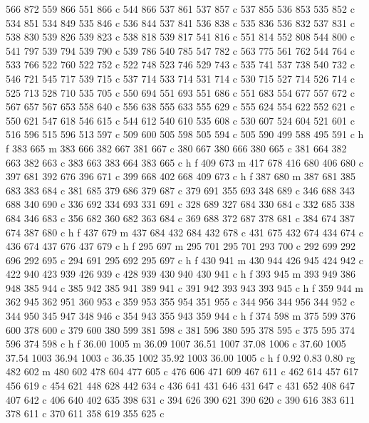 {{   566 872 559 866 551 866 c
   544 866 537 861 537 857 c
   537 855 536 853 535 852 c
   534 851 534 849 535 846 c
   536 844 537 841 536 838 c
   535 836 536 832 537 831 c
   538 830 539 826 539 823 c
   538 818 539 817 541 816 c
   551 814 552 808 544 800 c
   541 797 539 794 539 790 c
   539 786 540 785 547 782 c
   563 775 561 762 544 764 c
   533 766 522 760 522 752 c
   522 748 523 746 529 743 c
   535 741 537 738 540 732 c
   546 721 545 717 539 715 c
   537 714 533 714 531 714 c
   530 715 527 714 526 714 c
   525 713 528 710 535 705 c
   550 694 551 693 551 686 c
   551 683 554 677 557 672 c
   567 657 567 653 558 640 c
   556 638 555 633 555 629 c
   555 624 554 622 552 621 c
   550 621 547 618 546 615 c
   544 612 540 610 535 608 c
   530 607 524 604 521 601 c
   516 596 515 596 513 597 c
   509 600 505 598 505 594 c
   505 590 499 588 495 591 c
   h f
   383 665 m
   383 666 382 667 381 667 c
   380 667 380 666 380 665 c
   381 664 382 663 382 663 c
   383 663 383 664 383 665 c
   h f
   409 673 m
   417 678 416 680 406 680 c
   397 681 392 676 396 671 c
   399 668 402 668 409 673 c
   h f
   387 680 m
   387 681 385 683 383 684 c
   381 685 379 686 379 687 c
   379 691 355 693 348 689 c
   346 688 343 688 340 690 c
   336 692 334 693 331 691 c
   328 689 327 684 330 684 c
   332 685 338 684 346 683 c
   356 682 360 682 363 684 c
   369 688 372 687 378 681 c
   384 674 387 674 387 680 c
   h f
   437 679 m
   437 684 432 684 432 678 c
   431 675 432 674 434 674 c
   436 674 437 676 437 679 c
   h f
   295 697 m
   295 701 295 701 293 700 c
   292 699 292 696 292 695 c
   294 691 295 692 295 697 c
   h f
   430 941 m
   430 944 426 945 424 942 c
   422 940 423 939 426 939 c
   428 939 430 940 430 941 c
   h f
   393 945 m
   393 949 386 948 385 944 c
   385 942 385 941 389 941 c
   391 942 393 943 393 945 c
   h f
   359 944 m
   362 945 362 951 360 953 c
   359 953 355 954 351 955 c
   344 956 344 956 344 952 c
   344 950 345 947 348 946 c
   354 943 355 943 359 944 c
   h f
   374 598 m
   375 599 376 600 378 600 c
   379 600 380 599 381 598 c
   381 596 380 595 378 595 c
   375 595 374 596 374 598 c
   h f
   36.00 1005 m
   36.09 1007 36.51 1007 37.08 1006 c
   37.60 1005 37.54 1003 36.94 1003 c
   36.35 1002 35.92 1003 36.00 1005 c
   h f
   0.92 0.83 0.80 rg
   482 602 m
   480 602 478 604 477 605 c
   476 606 471 609 467 611 c
   462 614 457 617 456 619 c
   454 621 448 628 442 634 c
   436 641 431 646 431 647 c
   431 652 408 647 407 642 c
   406 640 402 635 398 631 c
   394 626 390 621 390 620 c
   390 616 383 611 378 611 c
   370 611 358 619 355 625 c
}}
